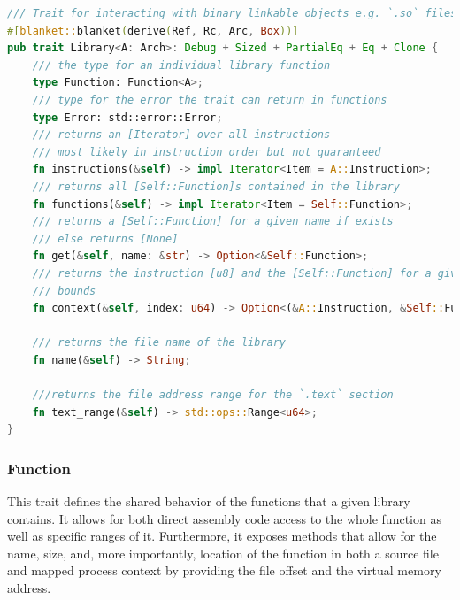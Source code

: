 \begin{lstlisting}[caption=\label{lst:library}"The Library Trait definition", language=Rust]
/// Trait for interacting with binary linkable objects e.g. `.so` files
#[blanket::blanket(derive(Ref, Rc, Arc, Box))]
pub trait Library<A: Arch>: Debug + Sized + PartialEq + Eq + Clone {
    /// the type for an individual library function
    type Function: Function<A>;
    /// type for the error the trait can return in functions
    type Error: std::error::Error;
    /// returns an [Iterator] over all instructions
    /// most likely in instruction order but not guaranteed
    fn instructions(&self) -> impl Iterator<Item = A::Instruction>;
    /// returns all [Self::Function]s contained in the library
    fn functions(&self) -> impl Iterator<Item = Self::Function>;
    /// returns a [Self::Function] for a given name if exists
    /// else returns [None]
    fn get(&self, name: &str) -> Option<&Self::Function>;
    /// returns the instruction [u8] and the [Self::Function] for a given index if inside library
    /// bounds
    fn context(&self, index: u64) -> Option<(&A::Instruction, &Self::Function)>;

    /// returns the file name of the library
    fn name(&self) -> String;

    ///returns the file address range for the `.text` section
    fn text_range(&self) -> std::ops::Range<u64>;
}
\end{lstlisting}  

    \subsubsection{Function}
    \label{reader:function} 
    
    This trait defines the shared behavior of the functions that a given library contains.
    It allows for both direct assembly code access to the whole function as well as specific ranges of it.
    Furthermore, it exposes methods that allow for the name, size, and, more importantly, location of the function in both a source file and mapped process context by providing the file offset and the virtual memory address.

